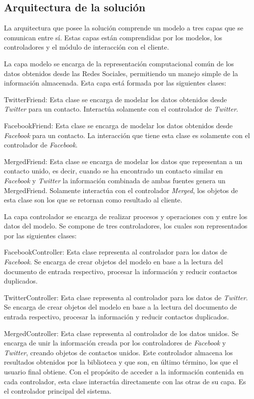 \subsection{Arquitectura de la solución}

La arquitectura que posee la solución comprende un modelo a tres capas que se comunican entre sí. Estas capas están comprendidas por los modelos, los controladores y el módulo de interacción con el cliente.

La capa modelo se encarga de la representación computacional común de los datos obtenidos desde las Redes Sociales, permitiendo un manejo simple de la información almacenada. Esta capa está formada por las siguientes clases:

\begin{list}{•}
\item TwitterFriend: Esta clase se encarga de modelar los datos obtenidos desde \textit{Twitter} para un contacto. Interactúa solamente con el controlador de \textit{Twitter}. 
\item FacebookFriend: Esta clase se encarga de modelar los datos obtenidos desde \textit{Facebook} para un contacto. La interacción que tiene esta clase es solamente con el controlador de \textit{Facebook}.
\item MergedFriend: Esta clase se encarga de modelar los datos que representan a un contacto unido, es decir, cuando se ha encontrado un contacto similar en \textit{Facebook} y \textit{Twitter} la información combinada de ambas fuentes genera un MergedFriend. Solamente interactúa con el controlador \textit{Merged}, los objetos de esta clase son los que se retornan como resultado al cliente.
\end{list}

La capa controlador se encarga de realizar procesos y operaciones con y entre los datos del modelo. Se compone de tres controladores, los cuales son representados por las siguientes clases:

\begin{list}{•}
\item FacebookController: Esta clase representa al controlador para los datos de \textit{Facebook}. Se encarga de crear objetos del modelo en base a la lectura del documento de entrada respectivo, procesar la información y reducir contactos duplicados.
\item TwitterController: Esta clase representa al controlador para los datos de \textit{Twitter}. Se encarga de crear objetos del modelo en base a la lectura del documento de entrada respectivo, procesar la información y reducir contactos duplicados. 
\item MergedController: Esta clase representa al controlador de los datos unidos. Se encarga de unir la información creada por los controladores de \textit{Facebook} y \textit{Twitter}, creando objetos de contactos unidos. Este controlador almacena los resultados obtenidos por la biblioteca y que son, en último término, los que el usuario final obtiene. Con el propósito de acceder a la información contenida en cada controlador, esta clase interactúa directamente con las otras de su capa. Es el controlador principal del sistema.
\end{list}

